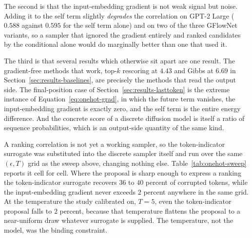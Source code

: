 The second is that the input-embedding gradient is not weak signal but noise. Adding it to the self term slightly \emph{degrades} the correlation on GPT-2 Large ($0.588$ against $0.595$ for the self term alone) and on two of the three GFlowNet variants, so a sampler that ignored the gradient entirely and ranked candidates by the conditional alone would do marginally better than one that used it.

The third is that several results which otherwise sit apart are one result. The gradient-free methods that work, top-$k$ rescoring at $4.43$ and Gibbs at $6.69$ in Section~\ref{sec:results-baselines}, are precisely the methods that read the output side. The final-position case of Section~\ref{sec:results-lasttoken} is the extreme instance of Equation~\eqref{eq:onehot-grad}, in which the future term vanishes, the input-embedding gradient is exactly zero, and the self term is the entire energy difference. And the concrete score of a discrete diffusion model is itself a ratio of sequence probabilities, which is an output-side quantity of the same kind.

A ranking correlation is not yet a working sampler, so the token-indicator surrogate was substituted into the discrete sampler itself and run over the same $(\epsilon, T)$ grid as the sweep above, changing nothing else. Table~\ref{tab:onehot-sweep} reports it cell for cell. Where the proposal is sharp enough to express a ranking the token-indicator surrogate recovers $36$ to $40$ percent of corrupted tokens, while the input-embedding gradient never exceeds $2$ percent anywhere in the same grid. At the temperature the study calibrated on, $T = 5$, even the token-indicator proposal falls to $2$ percent, because that temperature flattens the proposal to a near-uniform draw whatever surrogate is supplied. The temperature, not the model, was the binding constraint.

